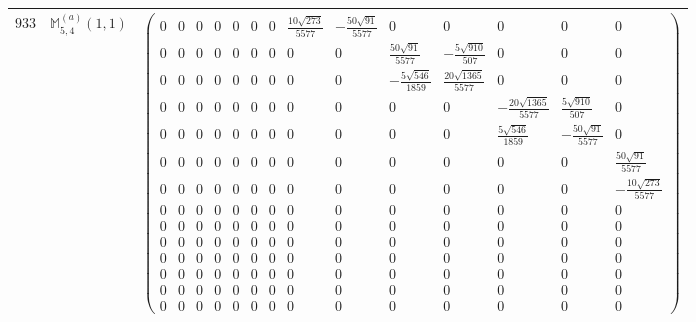 \documentclass[fleqn,8pt,landscape]{jsarticle}
\begin{document}
\begin{center}
\begin{longtable}{ccc}
$ 933 $ & $ \mathbb{M}_{5,4}^{(a)}(1,1) $ & $ \begin{pmatrix} 0 & 0 & 0 & 0 & 0 & 0 & 0 & \frac{10 \sqrt{273}}{5577} & - \frac{50 \sqrt{91}}{5577} & 0 & 0 & 0 & 0 & 0 \\ 0 & 0 & 0 & 0 & 0 & 0 & 0 & 0 & 0 & \frac{50 \sqrt{91}}{5577} & - \frac{5 \sqrt{910}}{507} & 0 & 0 & 0 \\ 0 & 0 & 0 & 0 & 0 & 0 & 0 & 0 & 0 & - \frac{5 \sqrt{546}}{1859} & \frac{20 \sqrt{1365}}{5577} & 0 & 0 & 0 \\ 0 & 0 & 0 & 0 & 0 & 0 & 0 & 0 & 0 & 0 & 0 & - \frac{20 \sqrt{1365}}{5577} & \frac{5 \sqrt{910}}{507} & 0 \\ 0 & 0 & 0 & 0 & 0 & 0 & 0 & 0 & 0 & 0 & 0 & \frac{5 \sqrt{546}}{1859} & - \frac{50 \sqrt{91}}{5577} & 0 \\ 0 & 0 & 0 & 0 & 0 & 0 & 0 & 0 & 0 & 0 & 0 & 0 & 0 & \frac{50 \sqrt{91}}{5577} \\ 0 & 0 & 0 & 0 & 0 & 0 & 0 & 0 & 0 & 0 & 0 & 0 & 0 & - \frac{10 \sqrt{273}}{5577} \\ 0 & 0 & 0 & 0 & 0 & 0 & 0 & 0 & 0 & 0 & 0 & 0 & 0 & 0 \\ 0 & 0 & 0 & 0 & 0 & 0 & 0 & 0 & 0 & 0 & 0 & 0 & 0 & 0 \\ 0 & 0 & 0 & 0 & 0 & 0 & 0 & 0 & 0 & 0 & 0 & 0 & 0 & 0 \\ 0 & 0 & 0 & 0 & 0 & 0 & 0 & 0 & 0 & 0 & 0 & 0 & 0 & 0 \\ 0 & 0 & 0 & 0 & 0 & 0 & 0 & 0 & 0 & 0 & 0 & 0 & 0 & 0 \\ 0 & 0 & 0 & 0 & 0 & 0 & 0 & 0 & 0 & 0 & 0 & 0 & 0 & 0 \\ 0 & 0 & 0 & 0 & 0 & 0 & 0 & 0 & 0 & 0 & 0 & 0 & 0 & 0 \end{pmatrix} $ \\ \hline

\end{longtable}
\end{center}
\end{document}
